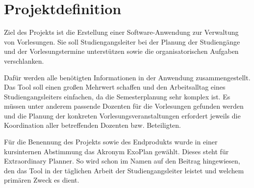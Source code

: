 \section{Projektdefinition}
Ziel des Projekts ist die Erstellung einer Software-Anwendung zur Verwaltung von Vorlesungen.
Sie soll Studiengangsleiter bei der Planung der Studiengänge und der Vorlesungstermine unterstützen sowie die organisatorischen Aufgaben verschlanken. 

Dafür werden alle benötigten Informationen in der Anwendung zusammengestellt.
Das Tool soll einen großen Mehrwert schaffen und den Arbeitsalltag eines Studiengangsleiters einfachen, da die Semesterplanung sehr komplex ist.
Es müssen unter anderem passende Dozenten für die Vorlesungen gefunden werden und die Planung der konkreten Vorlesungsveranstaltungen erfordert jeweils die Koordination aller betreffenden Dozenten bzw. Beteiligten.

Für die Benennung des Projekts sowie des Endprodukts wurde in einer kursinternen Abstimmung das Akronym ExoPlan gewählt.
Dieses steht für Extraordinary Planner.
So wird schon im Namen auf den Beitrag hingewiesen, den das Tool in der täglichen Arbeit der Studiengangsleiter leistet und welchem primären Zweck es dient.